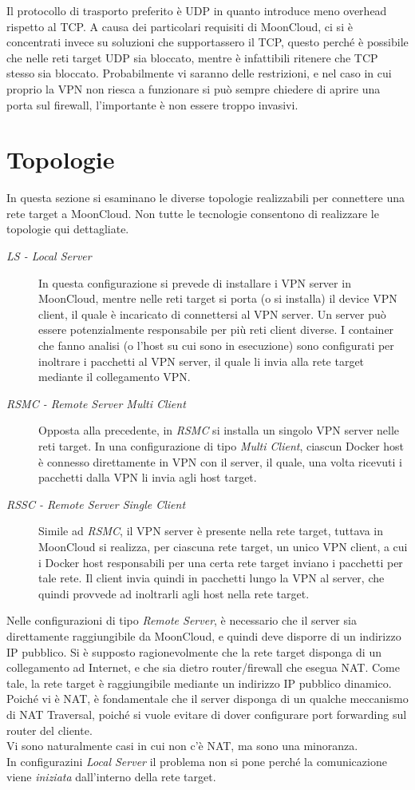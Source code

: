 Il protocollo di trasporto preferito è UDP in quanto introduce meno overhead rispetto al TCP. A causa
dei particolari requisiti di MoonCloud, ci si è concentrati invece su soluzioni che
supportassero il TCP, questo perché è possibile che nelle reti target UDP sia bloccato,
mentre è infattibili ritenere che TCP stesso sia bloccato. Probabilmente vi saranno
delle restrizioni, e nel caso in cui proprio la VPN non riesca a funzionare si può sempre
chiedere di aprire una porta sul firewall, l'importante è non essere troppo invasivi.


\section{Topologie}
In questa sezione si esaminano le diverse topologie realizzabili per connettere una rete
target a MoonCloud. Non tutte le tecnologie consentono di realizzare le topologie qui
dettagliate.
\begin{description}
  \item[\textit{LS - Local Server}]In questa configurazione si prevede di installare i
  VPN server in MoonCloud, mentre nelle reti target si porta (o si installa) il device
  VPN client, il quale è incaricato di connettersi al VPN server. Un server può essere
  potenzialmente responsabile per più reti client diverse. I container che fanno analisi
  (o l'host su cui sono in esecuzione)
  sono configurati per inoltrare i pacchetti al VPN server, il quale li invia alla rete
  target mediante il collegamento VPN.
  \item[\textit{RSMC - Remote Server Multi Client}]Opposta alla precedente, in \textit{RSMC}
  si installa un singolo VPN server nelle reti target. In una configurazione di tipo
  \textit{Multi Client}, ciascun Docker host è connesso direttamente in VPN con il server, il
  quale, una volta ricevuti i pacchetti dalla VPN li invia agli host target.
  \item[\textit{RSSC - Remote Server Single Client}]Simile ad \textit{RSMC}, il VPN
  server è presente nella rete target, tuttava in MoonCloud si realizza, per ciascuna rete
  target, un unico VPN client, a cui i Docker host responsabili per una certa rete target inviano
  i pacchetti per tale rete. Il client invia quindi in pacchetti lungo la VPN al server,
  che quindi provvede ad inoltrarli agli host nella rete target.
\end{description}
Nelle configurazioni di tipo \textit{Remote Server}, è necessario che il server sia
direttamente raggiungibile da MoonCloud, e quindi deve disporre di un indirizzo IP pubblico.
Si è supposto ragionevolmente che la rete target disponga di un collegamento ad Internet, e che
sia dietro router/firewall che esegua NAT. Come tale, la rete target è raggiungibile
mediante un indirizzo IP pubblico dinamico. Poiché vi è NAT, è fondamentale che il server disponga
di un qualche meccanismo di NAT Traversal, poiché si vuole evitare di dover configurare
port forwarding sul router del cliente.\\
Vi sono naturalmente casi in cui non c'è NAT, ma sono una minoranza.\\
In configurazini \textit{Local Server} il problema non si pone perché la comunicazione viene
\textit{iniziata} dall'interno della rete target.

